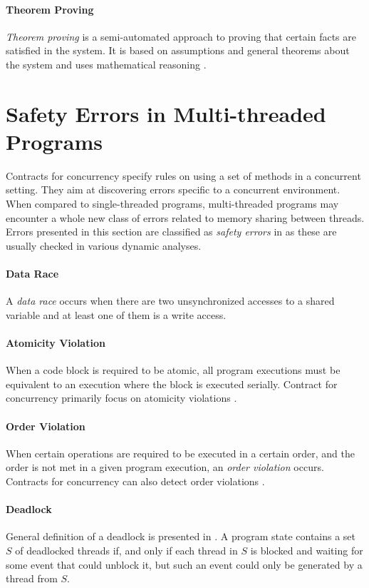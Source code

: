 \paragraph{Theorem Proving}
\emph{Theorem proving} is a semi-automated approach to proving that certain
facts are satisfied in the system. It is based on assumptions and general
theorems about the system and uses mathematical reasoning \cite{fundamentals}.


\section{Safety Errors in Multi-threaded Programs}

Contracts for concurrency specify rules on using a set of methods in a
concurrent setting. They aim at discovering errors specific to a concurrent
environment. When compared to single-threaded programs, multi-threaded programs
may encounter a whole new class of errors related to memory sharing between
threads. Errors presented in this section are classified as \emph{safety errors}
in \cite{letko} as these are usually checked in various dynamic analyses.

\paragraph{Data Race}
A \emph{data race} occurs when there are two unsynchronized accesses to a shared
variable and at least one of them is a write access.

\paragraph{Atomicity Violation}
When a code block is required to be atomic, all program executions must be
equivalent to an execution where the block is executed serially. Contract for
concurrency primarily focus on atomicity violations \cite{contracts}.

\paragraph{Order Violation}
When certain operations are required to be executed
in a certain order, and the order is not met in a given program execution, an
\emph{order violation} occurs. Contracts for concurrency can also detect order
violations \cite{contracts}.

\paragraph{Deadlock}
General definition of a deadlock is presented in
\cite{letko}. A program state contains a set $S$ of deadlocked threads if, and
only if each thread in $S$ is blocked and waiting for some event that could
unblock it, but such an event could only be generated by a thread from $S$.

